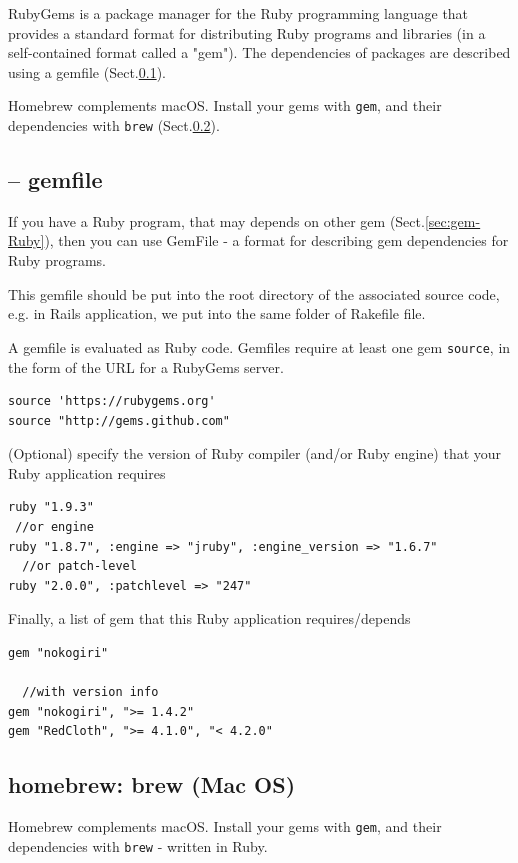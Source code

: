 RubyGems is a package manager for the Ruby programming language that provides a
standard format for distributing Ruby programs and libraries (in a
self-contained format called a "gem"). The dependencies of packages are
described using a gemfile (Sect.\ref{sec:gem-file}).

Homebrew complements macOS. Install your gems with \verb!gem!, and their
dependencies with \verb!brew! (Sect.\ref{sec:homebrew}).

\subsection{-- gemfile}
\label{sec:gem-file}

If you have a Ruby program, that may depends on other gem
(Sect.\ref{sec:gem-Ruby}), then you can use GemFile - a format for describing
gem dependencies for Ruby programs.

This gemfile should be put into the root directory of the associated source
code, e.g. in Rails application, we put into the same folder of Rakefile file. 

A gemfile is evaluated as Ruby code.
Gemfiles require at least one gem \verb!source!, in the form of the URL for a
RubyGems server. 
\begin{verbatim}
source 'https://rubygems.org'
source "http://gems.github.com"
\end{verbatim}
(Optional) specify the version of Ruby compiler (and/or Ruby engine) that your
Ruby application requires
\begin{verbatim}
ruby "1.9.3"
 //or engine
ruby "1.8.7", :engine => "jruby", :engine_version => "1.6.7"
  //or patch-level
ruby "2.0.0", :patchlevel => "247"
\end{verbatim}

Finally, a list of gem that this Ruby application requires/depends
\begin{verbatim}
gem "nokogiri"

  //with version info
gem "nokogiri", ">= 1.4.2"
gem "RedCloth", ">= 4.1.0", "< 4.2.0"
\end{verbatim}

\subsection{homebrew: brew (Mac OS)}
\label{sec:homebrew}

Homebrew complements macOS. Install your gems with \verb!gem!, and their
dependencies with \verb!brew! - written in Ruby.

